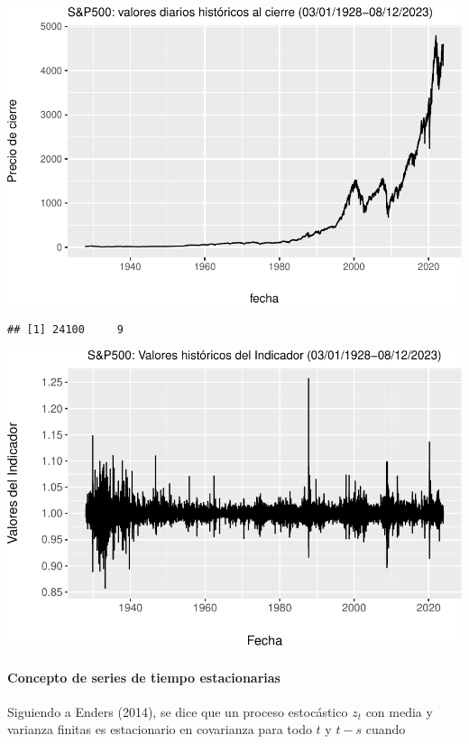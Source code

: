 \documentclass[
  oneside]{article}
\begin{document}
\includegraphics{Entrega_Laura_Montaldo_files/figure-latex/plot1-1.pdf}

\begin{verbatim}
## [1] 24100     9
\end{verbatim}

\includegraphics{Entrega_Laura_Montaldo_files/figure-latex/unnamed-chunk-14-1.pdf}

\hypertarget{concepto-de-series-de-tiempo-estacionarias}{%
\paragraph{Concepto de series de tiempo
estacionarias}\label{concepto-de-series-de-tiempo-estacionarias}}

Siguiendo a Enders (2014), se dice que un proceso estocástico \(z_{t}\)
con media y varianza finitas es estacionario en covarianza para todo
\(t\) y \(t-s\) cuando
\end{document}
